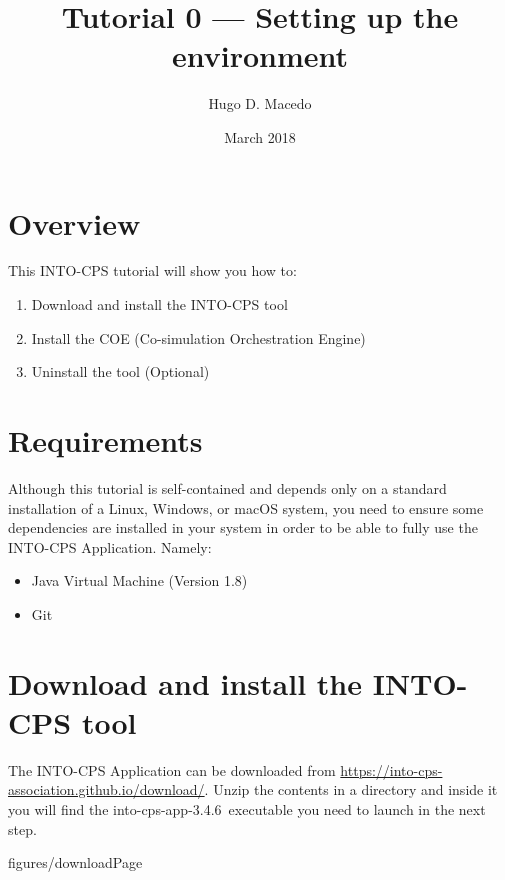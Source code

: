 \documentclass[11pt,a4paper]{../tutorial}
\title{Tutorial 0 --- Setting up the environment}
\date{March 2018}
\author{Hugo D. Macedo}
\def\intocpsVer{3.4.6}
\begin{document}
\section*{Overview}

This INTO-CPS tutorial will show you how to:

\begin{enumerate}[noitemsep]
\item Download and install the INTO-CPS tool
\item Install the COE (Co-simulation Orchestration Engine)
\item Uninstall the tool (Optional) 
\end{enumerate}

\section*{Requirements}

Although this tutorial is self-contained and depends only on a standard
installation of a Linux, Windows, or macOS system, you need to ensure some
dependencies are installed in your system in order to be able to fully use the
INTO-CPS Application. Namely: 

\begin{itemize}[noitemsep]
\item Java Virtual Machine (Version 1.8)
\item Git
\end{itemize}


\section{Download and install the INTO-CPS tool}


\begin{instructions} 

\item The INTO-CPS Application can be downloaded from
	\url{https://into-cps-association.github.io/download/}. Unzip the
	contents in a directory and inside it you will find the into-cps-app-\intocpsVer\
	executable you need to launch in the next step. 
	
	\begin{annotation}[width=0.85\linewidth]{figures/downloadPage}
	\end{annotation}

\end{instructions}
\end{document}
